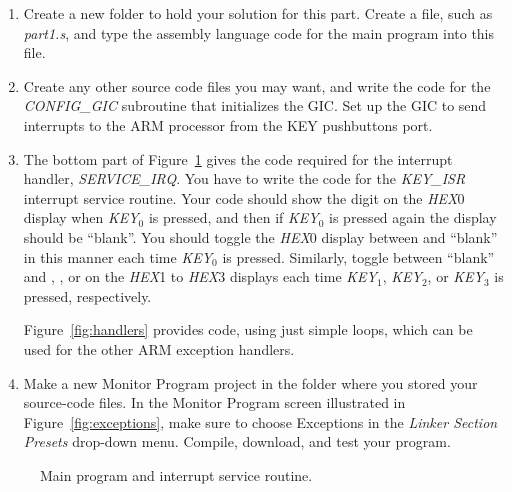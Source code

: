 \documentclass[epsfig,10pt,fullpage]{article}
\begin{document}
\begin{enumerate}
\item Create a new folder to hold your solution for this part. Create a
file, such as {\it part1.s}, and type the assembly language code for the main program 
into this file. 

\item Create any other source code files you may want, and write the code for the
{\it CONFIG\_GIC} subroutine that initializes the GIC. Set up the GIC to send interrupts
to the ARM processor from the KEY pushbuttons port. 

\item 
The bottom part of Figure~\ref{fig:code} gives the code required for the interrupt handler, 
{\it SERVICE\_IRQ}.  You have to write the code for the {\it KEY\_ISR} interrupt service routine.
Your code should show the digit  on the {\it HEX}0 display when {\it KEY}$_0$ is
pressed, and then if {\it KEY}$_0$ is pressed again the display should be ``blank''. You should
toggle the {\it HEX}0 display between  and ``blank'' in this manner each time 
{\it KEY}$_0$ is pressed. Similarly, toggle between ``blank'' and , , or 
 on the {\it HEX}1 to {\it HEX}3 displays each time {\it KEY}$_1$, {\it KEY}$_2$,
or {\it KEY}$_3$ is pressed, respectively. 

Figure~\ref{fig:handlers} provides code, using just simple loops, which can be used for the
other ARM exception handlers.

\item
Make a new Monitor Program project in the folder where you stored your source-code files.
In the Monitor Program screen illustrated in Figure~\ref{fig:exceptions}, make sure 
to choose {\sf Exceptions} in the {\it Linker Section Presets} drop-down menu.
Compile, download, and test your program. 
\end{enumerate}
\begin{figure}[H]
\begin{center}

\end{center}
\caption{Main program and interrupt service routine.}
\label{fig:code}
\end{figure}
\end{document}
